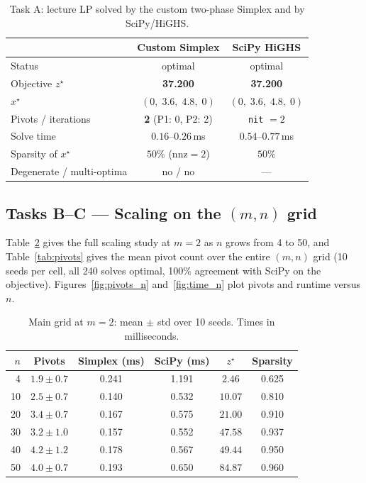 \documentclass[10pt]{article}
\begin{document}
\begin{table}[t]
\centering
\caption{Task A: lecture LP solved by the custom two-phase Simplex and by
SciPy/HiGHS.}
\label{tab:lecture}
\small
\begin{tabular}{lcc}
\toprule
 & \textbf{Custom Simplex} & \textbf{SciPy HiGHS} \\
\midrule
Status & optimal & optimal \\
Objective $z^\star$ & \textbf{37.200} & \textbf{37.200} \\
$x^\star$ & $(0,\;3.6,\;4.8,\;0)$ & $(0,\;3.6,\;4.8,\;0)$ \\
Pivots / iterations & \textbf{2} (P1: 0, P2: 2) & \texttt{nit} $=2$ \\
Solve time & $0.16$--$0.26$\,ms & $0.54$--$0.77$\,ms \\
Sparsity of $x^\star$ & $50\%$ ($\mathrm{nnz}=2$) & $50\%$ \\
Degenerate / multi-optima & no / no & --- \\
\bottomrule
\end{tabular}
\end{table}

\subsection{Tasks B--C --- Scaling on the $(m,n)$ grid}
Table~\ref{tab:m2} gives the full scaling study at $m=2$ as $n$ grows from
4 to 50, and Table~\ref{tab:pivots} gives the mean pivot count over the
entire $(m,n)$ grid (10 seeds per cell, all 240 solves optimal, 100\%
agreement with SciPy on the objective).  Figures~\ref{fig:pivots_n}
and~\ref{fig:time_n} plot pivots and runtime versus $n$.

\begin{table}[t]
\centering
\caption{Main grid at $m=2$: mean $\pm$ std over 10 seeds.  Times in
milliseconds.}
\label{tab:m2}
\footnotesize
\begin{tabular}{r c c c c c}
\toprule
$n$ & Pivots & Simplex (ms) & SciPy (ms) & $z^\star$ & Sparsity \\
\midrule
 4 & $1.9 \pm 0.7$ & 0.241 & 1.191 & $2.46$  & 0.625 \\
10 & $2.5 \pm 0.7$ & 0.140 & 0.532 & $10.07$ & 0.810 \\
20 & $3.4 \pm 0.7$ & 0.167 & 0.575 & $21.00$ & 0.910 \\
30 & $3.2 \pm 1.0$ & 0.157 & 0.552 & $47.58$ & 0.937 \\
40 & $4.2 \pm 1.2$ & 0.178 & 0.567 & $49.44$ & 0.950 \\
50 & $4.0 \pm 0.7$ & 0.193 & 0.650 & $84.87$ & 0.960 \\
\bottomrule
\end{tabular}
\end{table}
\end{document}

